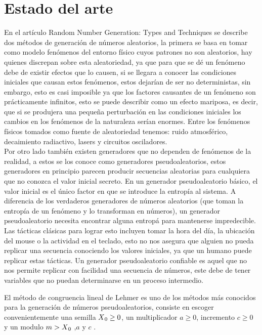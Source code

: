 \documentclass[conference,a4paper]{IEEEtran}
\begin{document}
\section{\textbf{Estado del arte}}
En el art\'iculo Random Number Generation: Types and Techniques \cite{b1} se describe dos m\'etodos de generaci\'on de n\'umeros aleatorios, la primera se basa en tomar como modelo fen\'omenos del entorno f\'isico cuyos patrones no son aleatorios, hay quienes discrepan sobre esta aleatoriedad, ya que para que se d\'e un fen\'omeno debe de existir efectos que lo causen, si se llegara a conocer las condiciones iniciales que causan estos fen\'omenos, estos dejar\'ian de ser no deterministas, sin embargo, esto es casi imposible ya que los factores causantes de un fen\'omeno son pr\'acticamente infinitos, esto se puede describir como un efecto mariposa, es decir, que si se produjera una peque\~na perturbaci\'on en las condiciones iniciales los cambios en los fen\'omenos de la naturaleza ser\'ian enormes. Entre los fen\'omenos f\'isicos tomados como fuente de aleatoriedad tenemos: ruido atmosf\'erico, decaimiento radiactivo, lasers y circuitos osciladores.\\
Por otro lado tambi\'en existen generadores que no dependen de fen\'omenos de la realidad, a estos se los conoce como generadores pseudoaleatorios, estos generadores en principio parecen producir secuencias aleatorias para cualquiera que no conozca el valor inicial secreto. En un generador pseudoaleatorio b\'asico, el valor inicial es el \'unico factor en que se introduce la entrop\'ia al sistema. A diferencia de los verdaderos generadores de n\'umeros aleatorios (que toman la entrop\'ia de un fen\'omeno y lo transforman en n\'umeros), un generador pseudoaleatorio necesita encontrar alguna entrop\'a para mantenerse impredecible. Las t\'acticas cl\'asicas para lograr esto incluyen tomar la hora del d\'ia, la ubicaci\'on del mouse o la actividad en el teclado, esto no nos asegura que alguien no pueda replicar una secuencia conociendo los valores iniciales, ya que un humano puede replicar estas t\'acticas. Un generador pseudoaleatorio confiable es aquel que no nos permite replicar con facilidad una secuencia de n\'umeros, este debe de tener variables que no puedan determinarse en un proceso intermedio.

El m\'etodo de congruencia lineal de Lehmer es uno de los m\'etodos m\'as conocidos para la generaci\'on de n\'umeros pseudoaleatorios, consiste en escoger convenientemente una semilla $X\textsubscript{0}\geq 0$, un multiplicador $a \geq 0$, incremento $c \geq 0$ y un modulo $m >X\textsubscript{0}$ ,$a$ y $c$ .
\end{document}
